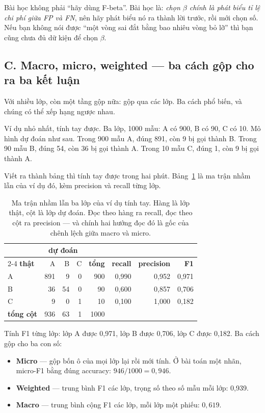 \documentclass[../../deep_learning.tex]{subfiles}
\begin{document}
Bài học không phải ``hãy dùng F-beta''. Bài học là: \emph{chọn \(\beta\) chính là phát biểu tỉ lệ chi phí giữa FP và FN}, nên hãy phát biểu nó ra thành lời trước, rồi mới chọn số. Nếu bạn không nói được ``một vòng sai đắt bằng bao nhiêu vòng bỏ lỡ'' thì bạn cũng chưa đủ dữ kiện để chọn \(\beta\).

\subsection{C. Macro, micro, weighted --- ba cách gộp cho ra ba kết luận}
Với nhiều lớp, còn một tầng gộp nữa: gộp qua các lớp. Ba cách phổ biến, và chúng có thể xếp hạng ngược nhau.

Ví dụ nhỏ nhất, tính tay được. Ba lớp, 1000 mẫu: A có 900, B có 90, C có 10. Mô hình dự đoán như sau. Trong 900 mẫu A, đúng 891, còn 9 bị gọi thành B. Trong 90 mẫu B, đúng 54, còn 36 bị gọi thành A. Trong 10 mẫu C, đúng 1, còn 9 bị gọi thành A.

Viết ra thành bảng thì tính tay được trong hai phút. Bảng~\ref{tab:b07-3lop} là ma trận nhầm lẫn của ví dụ đó, kèm precision và recall từng lớp.

\begin{table}[H]\centering\footnotesize
\caption{Ma trận nhầm lẫn ba lớp của ví dụ tính tay. Hàng là lớp thật, cột là lớp dự đoán. Đọc theo hàng ra recall, đọc theo cột ra precision --- và chính hai hướng đọc đó là gốc của chênh lệch giữa macro và micro.}
\label{tab:b07-3lop}
\begin{tabular}{@{}lrrrrrrr@{}}
\toprule
& \multicolumn{3}{c}{\textbf{dự đoán}} & & & & \\
\cmidrule(lr){2-4}
\textbf{thật} & A & B & C & \textbf{tổng} & \textbf{recall} & \textbf{precision} & \textbf{F1}\\
\midrule
A & 891 & 9 & 0 & 900 & 0{,}990 & 0{,}952 & 0{,}971\\
B & 36 & 54 & 0 & 90 & 0{,}600 & 0{,}857 & 0{,}706\\
C & 9 & 0 & 1 & 10 & 0{,}100 & 1{,}000 & 0{,}182\\
\midrule
\textbf{tổng cột} & 936 & 63 & 1 & 1000 & & & \\
\bottomrule
\end{tabular}
\end{table}

Tính F1 từng lớp: lớp A được 0{,}971, lớp B được 0{,}706, lớp C được 0{,}182. Ba cách gộp cho ba con số:
\begin{itemize}
\item \textbf{Micro} --- gộp bốn ô của mọi lớp lại rồi mới tính. Ở bài toán một nhãn, micro-F1 bằng đúng accuracy: \(946/1000 = 0{,}946\).
\item \textbf{Weighted} --- trung bình F1 các lớp, trọng số theo số mẫu mỗi lớp: 0{,}939.
\item \textbf{Macro} --- trung bình cộng F1 các lớp, mỗi lớp một phiếu: \(0{,}619\).
\end{itemize}
\end{document}
